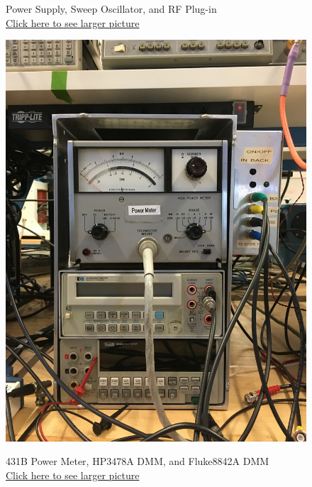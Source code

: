 \documentclass{../lab}
\begin{document}
\begin{figure}[!htb]
  \caption{Power Supply, Sweep Oscillator, and RF Plug-in\\ \href{http://experimentationlab.berkeley.edu/sites/default/files/JOS_3507_Power_Sweep_RF.JPG}{Click here to see larger picture}}
  \label{fig:JOS_3507_Power_Sweep_RF.jpg}
\endminipage\hfill
{}
  \href{http://experimentationlab.berkeley.edu/sites/default/files/JOS_3507_PowerMeter_DMM.JPG}{\includegraphics[width=\linewidth,keepaspectratio]{images/JOS_3507_PowerMeter_DMM.JPG}}
  \caption{431B Power Meter, HP3478A DMM, and Fluke8842A DMM\\ \href{http://experimentationlab.berkeley.edu/sites/default/files/JOS_3507_PowerMeter_DMM.JPG}{Click here to see larger picture}}
  \label{fig:JOS_3507_PowerMeter_DMM.jpg}
\endminipage
\end{figure}
\end{document}
